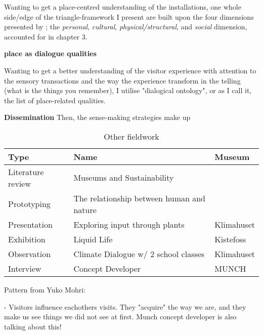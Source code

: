 Wanting to get a place-centred understanding of the installations, one whole side/edge of the triangle-framework I present are built upon the four dimensions presented by \autocite{hybridplace_ciolfi}; the \emph{personal}, \emph{cultural}, \emph{physical/structural}, and \emph{social} dimension, accounted for in chapter 3.


\textbf{place as dialogue qualities}

Wanting to get a better understanding of the visitor experience with attention to the sensory transactions and the way the experience transform in the telling (what is the things you remember), I utilise \autocite{spaceplace_ciolfi} "dialogical ontology", or as I call it, the list of place-related qualities. 

\textbf{Dissemination}
Then, the sense-making strategies make up



\begin{table}[h]
\centering
\begin{tabular}{l | l| l}
\textbf{Type} & \textbf{Name} & \textbf{Museum}\\
\hline
Literature review & Museums and Sustainability & \\
Prototyping & The relationship between human and nature \\
Presentation & Exploring input through plants & Klimahuset\\
Exhibition & Liquid Life & Kistefoss \\
Observation & Climate Dialogue w/ 2 school classes & Klimahuset\\
Interview & Concept Developer & MUNCH\\
\end{tabular}
\caption{Other fieldwork}
\label{tab:abc}
\end{table}


Pattern from Yuko Mohri:


- Visitors influence eachothers visits. They "acquire" the way we are, and they make us see things we did not see at first. Munch concept developer is also talking about this!


